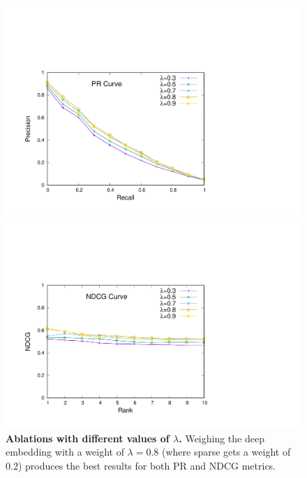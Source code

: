 \documentclass[
]{ceurart}
\begin{document}
\begin{figure}
  \centering
  \begin{minipage}{.48\linewidth}
    \centering
    \includegraphics[clip, trim=1.8cm 1.5cm 9cm 6cm, width=\linewidth]{figures/lambda.pdf}
  \end{minipage}%
  \hspace{0.4cm}
  \begin{minipage}{.48\linewidth}
    \centering
    \includegraphics[clip, trim=1.8cm 1.5cm 9cm 6cm, width=\linewidth]{figures/lambda.ndcg.pdf}
  \end{minipage}
  \caption{\textbf{Ablations with different values of $\lambda$.} Weighing the deep embedding with a weight of $\lambda=0.8$ (where sparse gets a weight of $0.2$) produces the best results for both PR and NDCG metrics.}
  \label{fig:results_lambda}
\end{figure}
\end{document}
